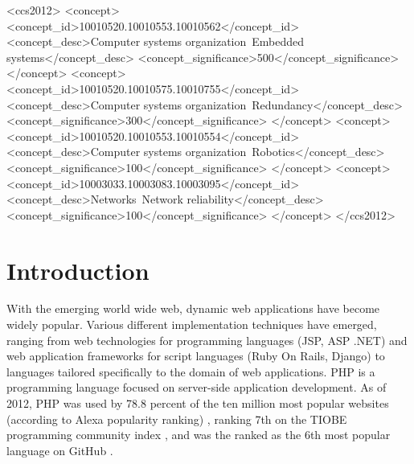 \documentclass[sigconf]{acmart}
\begin{document}
%
%
\begin{CCSXML}
<ccs2012>
 <concept>
  <concept_id>10010520.10010553.10010562</concept_id>
  <concept_desc>Computer systems organization~Embedded systems</concept_desc>
  <concept_significance>500</concept_significance>
 </concept>
 <concept>
  <concept_id>10010520.10010575.10010755</concept_id>
  <concept_desc>Computer systems organization~Redundancy</concept_desc>
  <concept_significance>300</concept_significance>
 </concept>
 <concept>
  <concept_id>10010520.10010553.10010554</concept_id>
  <concept_desc>Computer systems organization~Robotics</concept_desc>
  <concept_significance>100</concept_significance>
 </concept>
 <concept>
  <concept_id>10003033.10003083.10003095</concept_id>
  <concept_desc>Networks~Network reliability</concept_desc>
  <concept_significance>100</concept_significance>
 </concept>
</ccs2012>  
\end{CCSXML}




\maketitle

\section{Introduction}
With the emerging world wide web, dynamic web applications have become
widely popular. Various different implementation techniques have emerged,
ranging from web technologies for programming languages (JSP, ASP .NET) and web
application frameworks for  script languages (Ruby On Rails, Django) to
languages tailored specifically to the domain of web applications. PHP
\cite{phpNET} is a programming language focused on server-side application
development. As of 2012, PHP was used by 78.8 percent of the ten million most
popular websites (according to Alexa popularity ranking) \cite{alexaPHP}, ranking 7th on the TIOBE
programming community index \cite{tiobePHP}, and was the ranked as the 6th
most popular language on GitHub \cite{githubPHP}.
\end{document}
